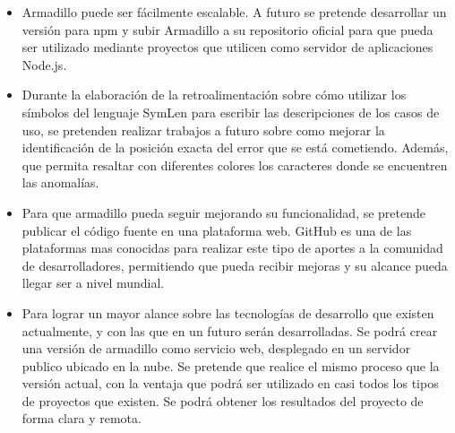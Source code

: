 \sloppy	
\begin{itemize}
	\item Armadillo puede ser fácilmente escalable. A futuro se pretende desarrollar un versión para npm y subir Armadillo a su repositorio oficial para que pueda ser utilizado mediante proyectos que utilicen como servidor de aplicaciones Node.js. 
	\item Durante la elaboración de la retroalimentación sobre cómo utilizar los símbolos del lenguaje SymLen para escribir las descripciones de los casos de uso, se pretenden realizar trabajos a futuro sobre como mejorar la identificación de la posición exacta del error que se está cometiendo. Además, que permita resaltar con diferentes colores  los caracteres donde se encuentren las anomalías.
	\item Para que armadillo pueda seguir mejorando su funcionalidad, se pretende publicar el código fuente en una plataforma web. GitHub es una de las plataformas mas conocidas para realizar este tipo de aportes a la comunidad de desarrolladores, permitiendo que pueda recibir mejoras y su alcance pueda llegar ser a nivel mundial.
	\item Para lograr un mayor alance sobre las tecnologías de desarrollo que existen actualmente, y con las que en un futuro serán desarrolladas. Se podrá crear una versión de armadillo como servicio web, desplegado en un servidor publico ubicado en la nube. Se pretende que realice el mismo proceso que la versión actual, con la ventaja que podrá ser utilizado en casi todos los tipos de proyectos que existen. Se podrá obtener los resultados del proyecto de forma clara y remota.  
\end{itemize}